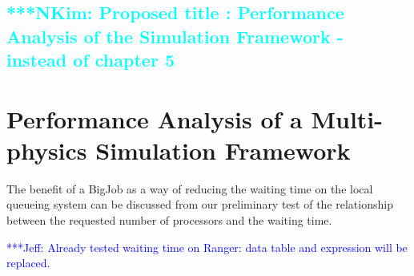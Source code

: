 \documentclass[preprint,12pt]{elsarticle}
\newcommand{\Nkimnote}[1]{ {\textcolor{cyan} { ***NKim: #1 }}}
\newcommand{\skonote}[1]{ {\textcolor{blue} { ***Jeff: #1 }}}
\newcommand{\Nkimnote}[1]{}
\newcommand{\skonote}[1]{}
\begin{document}
\subsection{
\Nkimnote{Proposed title : Performance Analysis of the Simulation Framework - instead of chapter 5}}
\section{Performance Analysis of a Multi-physics Simulation Framework}

The benefit of a BigJob as a way of reducing the waiting time on the local queueing system can be discussed from our preliminary test of the relationship between the requested number of processors and the waiting time.
\newline

\skonote{Already tested waiting time on Ranger: data table and expression will be replaced.}
\end{document}
